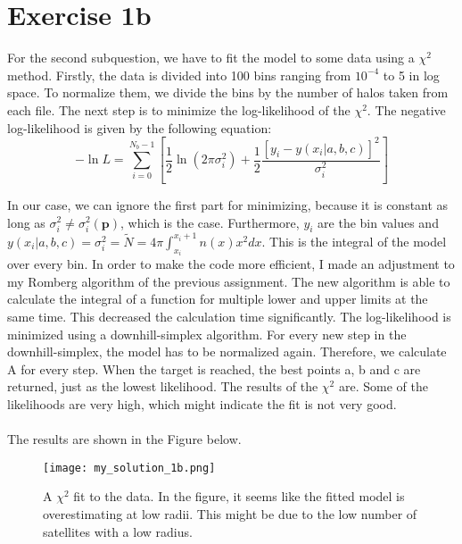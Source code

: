 \section{Exercise 1b}



For the second subquestion, we have to fit the model to some data using a $\chi^2$ method. Firstly, the data is divided into 100 bins ranging from $10^{-4}$ to 5 in log space. To normalize them, we divide the bins by the number of halos taken from each file. The next step is to minimize the log-likelihood of the $\chi^2$. The negative log-likelihood is given by the following equation: 
\begin{equation}
    -\ln{L} = \sum^{N_b-1}_{i = 0} \left[ \frac{1}{2} \ln(2\pi\sigma_i^2) +\frac{1}{2}\frac{[y_i - y(x_i|a,b,c)]^2}{\sigma_i^2}  \right]
\end{equation}

In our case, we can ignore the first part for minimizing, because it is constant as long as $\sigma_i^2 \neq \sigma_i^2(\textbf{p})$, which is the case. Furthermore, $y_i$ are the bin values and $y(x_i|a,b,c) = \sigma_i^2 = \tilde{N} = 4\pi\int^{x_i+1}_{x_i} n(x) x^2 dx$. This is the integral of the model over every bin. In order to make the code more efficient, I made an adjustment to my Romberg algorithm of the previous assignment. The new algorithm is able to calculate the integral of a function for multiple lower and upper limits at the same time. This decreased the calculation time significantly. The log-likelihood is minimized using a downhill-simplex algorithm. For every new step in the downhill-simplex, the model has to be normalized again. Therefore, we calculate A for every step. When the target is reached, the best points a, b and c are returned, just as the lowest likelihood. The results of the $\chi^2$ are. Some of the likelihoods are very high, which might indicate the fit is not very good. 
\\
\\



The results are shown in the Figure below.

\begin{figure}[h!]
  \centering
  \texttt{[image: my\_solution\_1b.png]}
  \caption{A $\chi^2$ fit to the data. In the figure, it seems like the fitted model is overestimating at low radii. This might be due to the low number of satellites with a low radius.}
\end{figure}


